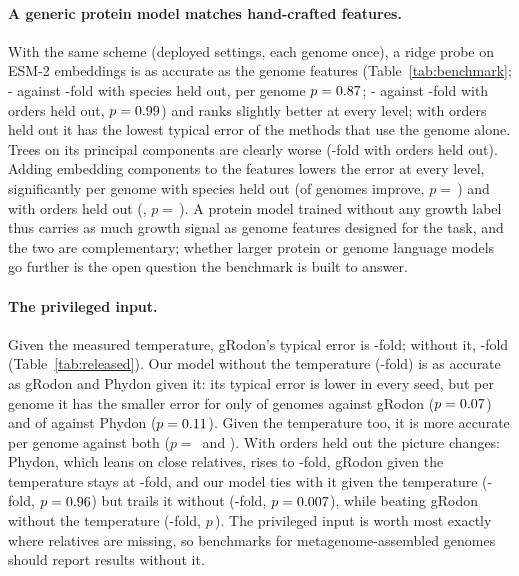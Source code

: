 \documentclass{article}
\begin{document}
\paragraph{A generic protein model matches hand-crafted features.} With the same scheme (deployed settings, each genome
once), a ridge probe on ESM-2 embeddings is as accurate as the genome features (Table~\ref{tab:benchmark};
\EsmProbeErrSameGenus- against \EsmFeatErrSameGenus-fold with species held out, per genome $p=0.87$;
\EsmProbeErrNewOrder- against \EsmFeatErrNewOrder-fold with orders held out, $p=0.99$) and ranks slightly
better at every level; with orders held out it has the lowest typical error of the methods that use the genome alone. Trees on its principal
components are clearly worse (\EsmTreesErrNewOrder-fold with orders held out). Adding \EsmPCComb embedding components to the
features lowers the error at every level, significantly per genome with species held out (\EsmCombBetterSameGenus of
\EsmPairNSameGenus genomes improve, $p=$\,\EsmCombPSameGenus) and with orders held out (\EsmCombBetterNewOrder,
$p=$\,\EsmCombPNewOrder). A protein model trained without any growth label thus carries as much growth signal as genome features designed for the task, and the two are complementary; whether larger protein or genome language models go further
is the open question the benchmark is built to answer.

\paragraph{The privileged input.} Given the measured temperature, gRodon's typical error is \RelGRodonErr-fold; without
it, \RelGRodonNoTempErr-fold (Table~\ref{tab:released}). Our model without the temperature (\RelOursErr-fold) is as accurate
as gRodon and Phydon given it: its typical error is lower in every seed, but per genome it has the smaller error for only
\PairGRodonBetter of \PairGRodonN genomes against gRodon ($p=0.07$) and \PairPhydonBetter of \PairPhydonN against
Phydon ($p=0.11$). Given the temperature too, it is more accurate per genome against both ($p=$\,\PairTempGRodonP
and \PairTempPhydonP). With orders held out the picture changes: Phydon, which leans on close relatives, rises to
\RelOrdPhydonErr-fold, gRodon given the temperature stays at \RelOrdGRodonErr-fold, and our model ties with it given the
temperature (\RelOrdOursTempErr-fold, $p=0.96$) but trails it without (\RelOrdOursErr-fold,
$p=0.007$), while beating gRodon without the temperature (\RelOrdGRodonNoTempErr-fold, $p$\,\PairOrdGRodonNoTempP).
The privileged input is worth most exactly where relatives are missing, so benchmarks for metagenome-assembled genomes should
report results without it.
\end{document}
